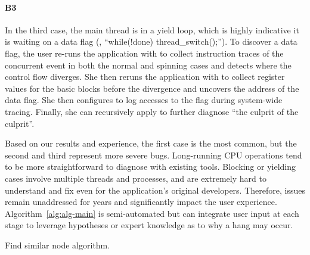 \paragraph{B3}

In the third case, the main thread is in a yield loop, which is
highly indicative it is waiting on a data flag (\eg, ``while(!done)
thread\_switch();''). To discover a data flag, the user re-runs the application
with \xxx to collect instruction traces of the concurrent event in both the
normal and spinning cases and detects where the control flow diverges. She
then reruns the application with \xxx to collect register values for the basic
blocks before the divergence and uncovers the address of the data flag. She
then configures \xxx to log accesses to the flag during system-wide tracing.
Finally, she can recursively apply \xxx to further diagnose ``the culprit of the
culprit''.

Based on our results and experience, the first case is the most common, but
the second and third represent more severe bugs. Long-running CPU operations
tend to be more straightforward to diagnose with existing tools. Blocking
or yielding cases involve multiple threads and processes, and are extremely
hard to understand and fix even for the application's original developers.
Therefore, issues remain unaddressed for years and significantly impact the user
experience. Algorithm~\ref{alg:alg-main} is semi-automated but can integrate
user input at each stage to leverage hypotheses or expert knowledge as to why a
hang may occur.

\begin{algorithm}[ht!]
    \caption{\xxx Find similar node algorithm.}
    \label{alg:alg-findsimilarnode}
\begin{algorithmic}[1]
\Statex
{}
		\EndIf
	\EndFor
		\EndIf
	\EndIf
\EndFor
\EndFunction
\end{algorithmic}
\end{algorithm}

